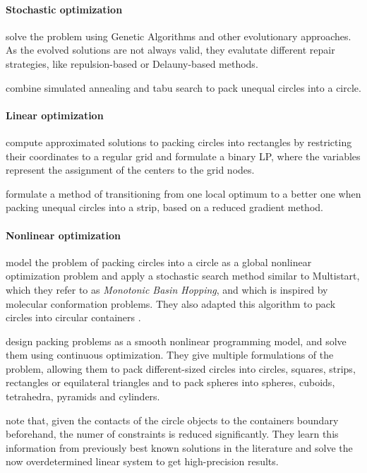 \documentclass[a4paper,style=print,bibliography=totoc,nexus,lnum,extramargin]{tubsbook}
\begin{document}
\paragraph{Stochastic optimization}

\textcite{FMC2015evolutionary} solve the problem using Genetic Algorithms and other evolutionary approaches. As the evolved solutions are not always valid, they evalutate different repair strategies, like repulsion-based or Delauny-based methods.

\textcite{ZD2005effective} combine simulated annealing and tabu search to pack unequal circles into a circle.

\paragraph{Linear optimization}

\textcite{LIE2014approximate} compute approximated solutions to packing circles into rectangles by restricting their coordinates to a regular grid and formulate a binary LP, where the variables represent the assignment of the centers to the grid nodes.

\textcite{SY2004mathematical} formulate a method of transitioning from one local optimum to a better one when packing unequal circles into a strip, based on a reduced gradient method.

\paragraph{Nonlinear optimization}

\textcite{ALS2008disk} model the problem of packing circles into a circle as a global nonlinear optimization problem and apply a stochastic search method similar to Multistart, which they refer to as \emph{Monotonic Basin Hopping}, and which is inspired by molecular conformation problems. They also adapted this algorithm to pack circles into circular containers \cite{GJLS2009solving}.

\textcite{BS2008minimizing} design packing problems as a smooth nonlinear programming model, and solve them using continuous optimization. They give multiple formulations of the problem, allowing them to pack different-sized circles into circles, squares, strips, rectangles or equilateral triangles and to pack spheres into spheres, cuboids, tetrahedra, pyramids and cylinders.

\textcite{BG2010new} note that, given the contacts of the circle objects to the containers boundary beforehand, the numer of constraints is reduced significantly. They learn this information from previously best known solutions in the literature and solve the now overdetermined linear system to get high-precision results.
\end{document}
